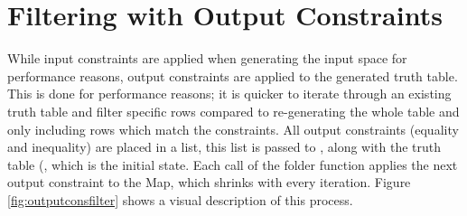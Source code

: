 


\section{Filtering with Output Constraints}
While input constraints are applied when generating the input space for performance reasons, output constraints are applied to the generated truth table. This is done for performance reasons; it is quicker to iterate through an existing truth table and filter specific rows compared to re-generating the whole table and only including rows which match the constraints. All output constraints (equality and inequality) are placed in a list, this list is passed to , along with the truth table (, which is the initial state. Each call of the folder function applies the next output constraint to the Map, which shrinks with every iteration. Figure \ref{fig:outputconsfilter} shows a visual description of this process.


